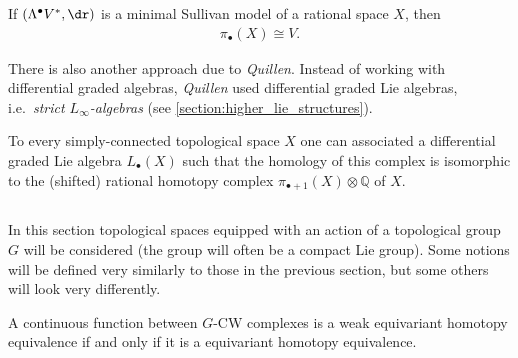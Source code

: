     \begin{property}
        If $(\Lambda^\bullet V^*,\dr)$ is a minimal Sullivan model of a rational space $X$, then
        \begin{gather}
            \pi_\bullet(X)\cong V.
        \end{gather}
    \end{property}

    There is also another approach due to \textit{Quillen}. Instead of working with differential graded algebras, \textit{Quillen} used differential graded Lie algebras, i.e.~\textit{strict $L_\infty$-algebras} (see \cref{section:higher_lie_structures}).
    \begin{construct}
        To every simply-connected topological space $X$ one can associated a differential graded Lie algebra $L_\bullet(X)$ such that the homology of this complex is isomorphic to the (shifted) rational homotopy complex $\pi_{\bullet+1}(X)\otimes\mathbb{Q}$ of $X$.
    \end{construct}

\subsection{}

    In this section topological spaces equipped with an action of a topological group $G$ will be considered (the group will often be a compact Lie group). Some notions will be defined very similarly to those in the previous section, but some others will look very differently.



    \begin{theorem}
        A continuous function between $G$-CW complexes is a weak equivariant homotopy equivalence if and only if it is a equivariant homotopy equivalence.
    \end{theorem}

